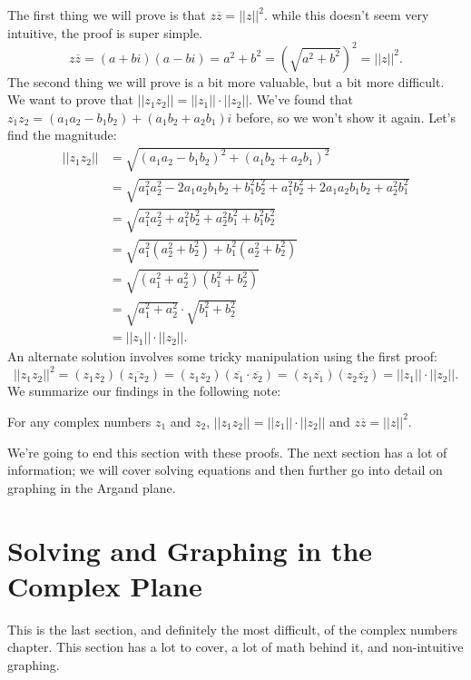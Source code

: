 \documentclass[lang=en,11pt]{elegantbook}
\begin{document}
The first thing we will prove is that $z\overline{z}=||z||^2$.  while this doesn't seem very intuitive, the proof is super simple.  $$z\overline{z}=\left(a+bi\right)\left(a-bi\right)=a^2+b^2=\left(\sqrt{a^2+b^2}\right)^2=||z||^2.$$
The second thing we will prove is a bit more valuable, but a bit more difficult.  We want to prove that $||z_1z_2||=||z_1|| \cdot ||z_2||$.  We've found that $z_1z_2=\left(a_1a_2-b_1b_2\right)+\left(a_1b_2+a_2b_1\right)i$ before, so we won't show it again.  Let's find the magnitude: \begin{align*}
    ||z_1z_2||&=\sqrt{\left(a_1a_2-b_1b_2\right)^2+\left(a_1b_2+a_2b_1\right)^2} \\
    &= \sqrt{a_1^2a_2^2-2a_1a_2b_1b_2+b_1^2b_2^2+a_1^2b_2^2+2a_1a_2b_1b_2+a_2^2b_1^2} \\
    &= \sqrt{a_1^2a_2^2+a_1^2b_2^2+a_2^2b_1^2+b_1^2b_2^2} \\ 
    &= \sqrt{a_1^2\left(a_2^2+b_2^2\right)+b_1^2\left(a_2^2+b_2^2\right)} \\
    &= \sqrt{\left(a_1^2+a_2^2\right)\left(b_1^2+b_2^2\right)} \\
    &= \sqrt{a_1^2+a_2^2}\cdot \sqrt{b_1^2+b_2^2} \\
    &=||z_1|| \cdot ||z_2||.
\end{align*}
An alternate solution involves some tricky manipulation using the first proof: $$||z_1z_2||^2=\left(z_1z_2\right)\left(\overline{z_1z_2}\right)=\left(z_1z_2\right)\left(\overline{z_1}\cdot \overline{z_2}\right)=\left(z_1\overline{z_1}\right)\left(z_2\overline{z_2}\right)=||z_1||\cdot ||z_2||.$$
We summarize our findings in the following note: \begin{note}
For any complex numbers $z_1$ and $z_2$, $||z_1z_2||=||z_1||\cdot ||z_2||$ and $z\overline{z}=||z||^2$.
\end{note}
\noindent We're going to end this section with these proofs.  The next section has a lot of information; we will cover solving equations and then further go into detail on graphing in the Argand plane.

\section{Solving and Graphing in the Complex Plane}
\noindent This is the last section, and definitely the most difficult, of the complex numbers chapter.  This section has a lot to cover, a lot of math behind it, and non-intuitive graphing.  
\end{document}
